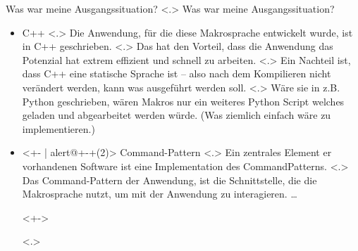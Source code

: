   \begin{frame}{Was war meine Ausgangssituation?}
    \vspace*{1em}%
    \pause
        \note[item]<.>{
          Was war meine Ausgangssituation?
        }
    \begin{itemize}[<+- | alert@+>]
      \item
        C++
            \note[item]<.>{
              Die Anwendung, für die diese Makrosprache entwickelt wurde, ist in C++ geschrieben.
            }
            \note[item]<.>{
              Das hat den Vorteil, dass die Anwendung das Potenzial hat extrem effizient und schnell zu arbeiten.
            }
            \note[item]<.>{
              Ein Nachteil ist, dass C++ eine statische Sprache ist -- also nach dem Kompilieren nicht verändert werden, kann was ausgeführt werden soll.
            }
            \note[item]<.>{
              Wäre sie in z.B. Python geschrieben, wären Makros nur ein weiteres Python Script welches geladen und abgearbeitet werden würde. (Was ziemlich einfach wäre zu implementieren.)
            }
      \item<+- | alert@+-+(2)>
        Command-Pattern%
            \note[item]<.>{
              Ein zentrales Element er vorhandenen Software ist eine Implementation des CommandPatterns.
            }
            \note[item]<.>{
              Das Command-Pattern der Anwendung, ist die Schnittstelle, die die Makrosprache nutzt, um mit der Anwendung zu interagieren. \ldots
            }
        \begin{uncoverenv}<+->%
          \begin{uncoverenv}<.>%
\end{uncoverenv}
\end{uncoverenv}
\end{itemize}
\end{frame}
